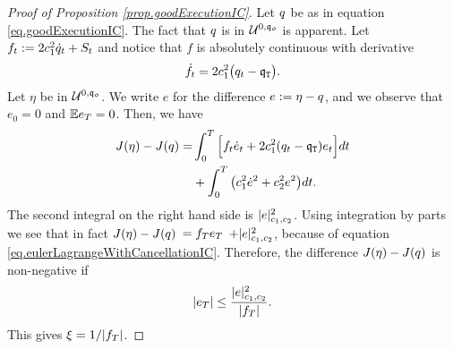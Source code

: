 \documentclass[10pt,a4paper]{article}
\begin{document}
\begin{proof}[Proof of Proposition \ref{prop.goodExecutionIC}]
Let $q$ be as in equation  \eqref{eq.goodExecutionIC}. The fact that $q$ is in $\mathcal{U}^{0,\mathfrak{q_0}}$ is apparent. Let $f_t:= 2c_{1}^{2} \dot{q}_{t} + S_t$ and notice that $f$ is absolutely continuous with derivative 
\begin{equation}\label{eq.eulerLagrangeWithCancellationIC}
\dot{f}_t = 2 c_{1}^{2} \big(q_t - \mathfrak{q}_{\mathtt{T} }\big).
\end{equation}
Let $\eta$ be in $\mathcal{U}^{0,\mathfrak{q_0}}$. We write $e$ for the difference $e:=\eta-q$, and we observe that $e_0=0$ and $\mathbb{{E}} e_T = 0$.  Then, we have 
\begin{equation*}
\begin{split}
J(\eta) - J(q) = &
\int_{0}^{T} \Big[ f_t \dot{e}_t + 2c_{1}^{2} (q_t - \mathfrak{q}_{\mathtt{T} })e_t\Big]dt\\
&+\int_{0}^{T}\big(c_{1}^{2} \dot{e}^{2} + c_{2}^{2} e^{2} \big)dt.
\end{split}
\end{equation*}
The second integral on the right hand side is $ \lvert e \rvert_{c_{1},c_{2}}^{2}$.  
Using integration by parts we see that in fact $J(\eta) - J(q) $ $= f_T e_T $ $ + \lvert e \rvert_{c_{1},c_{2}}^{2}$, because of equation \eqref{eq.eulerLagrangeWithCancellationIC}.  
Therefore, the difference $J(\eta) - J(q) $ is non-negative if 
\begin{equation*}
\left\lvert {e_T} \right\rvert
\leq \frac{ \lvert e \rvert_{c_{1},c_{2}}^{2}}{\left\lvert {f_T} \right\rvert}.
\end{equation*}
This gives $\xi = 1/\lvert f_T\rvert$.


\end{proof}
\end{document}
